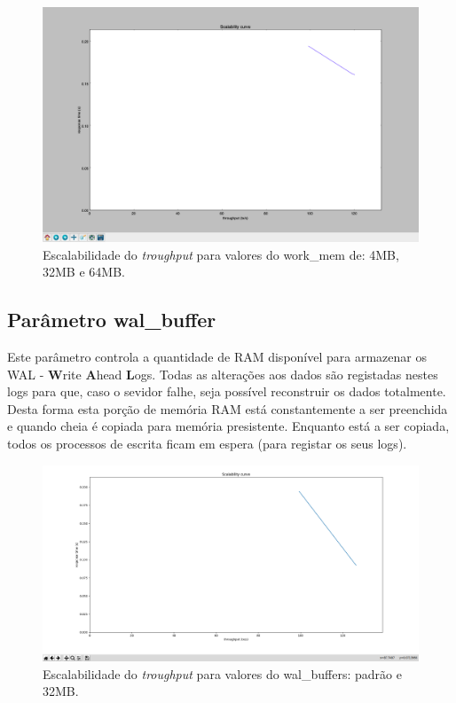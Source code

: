 \begin{figure}[H]
    \centering
    \includegraphics[scale=0.3]{imagens/work-mem-4MB-32MB-64MB.png}
    \caption{Escalabilidade do \emph{troughput} para valores do work\_mem de: 4MB, 32MB e 64MB.}
    \label{fig:exemplo}
\end{figure}

\newpage
\subsection{Parâmetro wal\_buffer}

\hspace{5mm} Este parâmetro controla a quantidade de RAM disponível para armazenar os WAL - \textbf{W}rite \textbf{A}head \textbf{L}ogs. Todas as alterações aos dados são registadas nestes logs para que, caso o sevidor falhe, seja possível reconstruir os dados totalmente. Desta forma esta porção de memória RAM está constantemente a ser preenchida e quando cheia é copiada para memória presistente. Enquanto está a ser copiada, todos os processos de escrita ficam em espera (para registar os seus logs).

\begin{figure}[H]
    \centering
    \includegraphics[scale=0.25]{imagens/wall_buffer.png}
    \caption{Escalabilidade do \emph{troughput} para valores do wal\_buffers: padrão e 32MB.}
    \label{fig:exemplo}
\end{figure}

